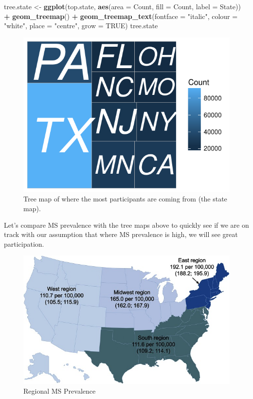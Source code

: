 \documentclass[]{article}
\newenvironment{Shaded}{\begin{snugshade}}{\end{snugshade}}
\newcommand{\KeywordTok}[1]{\textcolor[rgb]{0.13,0.29,0.53}{\textbf{#1}}}
\newcommand{\DataTypeTok}[1]{\textcolor[rgb]{0.13,0.29,0.53}{#1}}
\newcommand{\StringTok}[1]{\textcolor[rgb]{0.31,0.60,0.02}{#1}}
\newcommand{\OtherTok}[1]{\textcolor[rgb]{0.56,0.35,0.01}{#1}}
\newcommand{\OperatorTok}[1]{\textcolor[rgb]{0.81,0.36,0.00}{\textbf{#1}}}
\newcommand{\NormalTok}[1]{#1}
\begin{document}
\begin{Shaded}
\begin{Highlighting}[]
\NormalTok{tree.state <-}\StringTok{ }\KeywordTok{ggplot}\NormalTok{(top.state, }\KeywordTok{aes}\NormalTok{(}\DataTypeTok{area =}\NormalTok{ Count, }\DataTypeTok{fill =}\NormalTok{ Count, }
    \DataTypeTok{label =}\NormalTok{ State)) }\OperatorTok{+}\StringTok{ }\KeywordTok{geom_treemap}\NormalTok{() }\OperatorTok{+}\StringTok{ }\KeywordTok{geom_treemap_text}\NormalTok{(}\DataTypeTok{fontface =} \StringTok{"italic"}\NormalTok{, }
    \DataTypeTok{colour =} \StringTok{"white"}\NormalTok{, }\DataTypeTok{place =} \StringTok{"centre"}\NormalTok{, }\DataTypeTok{grow =} \OtherTok{TRUE}\NormalTok{)}
\NormalTok{tree.state}
\end{Highlighting}
\end{Shaded}

\begin{figure}
\centering
\includegraphics{index_files/figure-latex/tree-2.pdf}
\caption{Tree map of where the most participants are coming from (the
state map).}
\end{figure}

Let's compare MS prevalence with the tree maps above to quickly see if
we are on track with our assumption that where MS prevalence is high, we
will see great participation.

\begin{figure}
\centering
\includegraphics{RegionalMSprev.jpg}
\caption{Regional MS Prevalence}
\end{figure}
\end{document}
